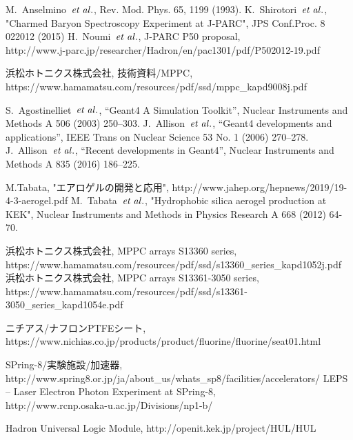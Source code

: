 \begin{thebibliography}{99}
   M.~Anselmino~${\it et\;al.}$, Rev. Mod. Phys. 65, 1199 (1993).
   K.~Shirotori~${\it et\;al.}$, "Charmed Baryon Spectroscopy Experiment at J-PARC", JPS Conf.Proc. 8 022012 (2015)
   H.~Noumi~${\it et\;al.}$, J-PARC P50 proposal, \\
  http://www.j-parc.jp/researcher/Hadron/en/pac1301/pdf/P502012-19.pdf
  
   浜松ホトニクス株式会社, 技術資料/MPPC, \\
  https://www.hamamatsu.com/resources/pdf/ssd/mppc\_kapd9008j.pdf
  
   S.~Agostinelliet~${\it et\;al.}$, “Geant4 A Simulation Toolkit”, Nuclear Instruments and Methods A 506 (2003) 250--303.
   J.~Allison~${\it et\;al.}$, “Geant4 developments and applications”, IEEE Trans on Nuclear Science 53 No. 1 (2006) 270--278.
   J.~Allison~${\it et\;al.}$, “Recent developments in Geant4”, Nuclear Instruments and Methods A 835 (2016) 186--225.
  
   M.Tabata, "エアロゲルの開発と応用", http://www.jahep.org/hepnews/2019/19-4-3-aerogel.pdf
   M.~Tabata~${\it et\;al.}$, "Hydrophobic silica aerogel production at KEK", Nuclear Instruments and Methods in Physics Research A 668 (2012) 64-70.
  
   浜松ホトニクス株式会社, MPPC arrays S13360 series, \\
  https://www.hamamatsu.com/resources/pdf/ssd/s13360\_series\_kapd1052j.pdf
   浜松ホトニクス株式会社, MPPC arrays S13361-3050 series, \\
   https://www.hamamatsu.com/resources/pdf/ssd/s13361-3050\_series\_kapd1054e.pdf
  
   ニチアス/ナフロンPTFEシート, \\
  https://www.nichias.co.jp/products/product/fluorine/fluorine/seat01.html
  
   SPring-8/実験施設/加速器, \\
  http://www.spring8.or.jp/ja/about\_us/whats\_sp8/facilities/accelerators/
   LEPS -- Laser Electron Photon Experiment at SPring-8, \\
  http://www.rcnp.osaka-u.ac.jp/Divisions/np1-b/
  
   Hadron Universal Logic Module, http://openit.kek.jp/project/HUL/HUL
  

\end{thebibliography}
